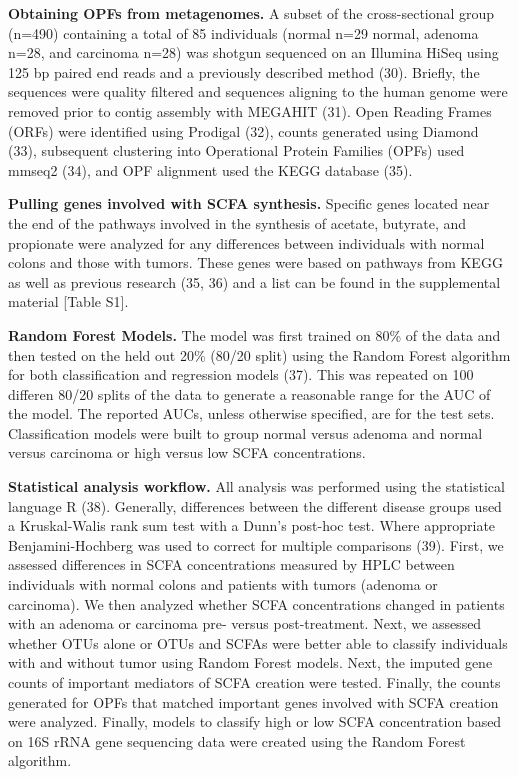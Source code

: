 \documentclass[11pt,]{article}
\begin{document}
\textbf{Obtaining OPFs from metagenomes.} A subset of the
cross-sectional group (n=490) containing a total of 85 individuals
(normal n=29 normal, adenoma n=28, and carcinoma n=28) was shotgun
sequenced on an Illumina HiSeq using 125 bp paired end reads and a
previously described method (30). Briefly, the sequences were quality
filtered and sequences aligning to the human genome were removed prior
to contig assembly with MEGAHIT (31). Open Reading Frames (ORFs) were
identified using Prodigal (32), counts generated using Diamond (33),
subsequent clustering into Operational Protein Families (OPFs) used
mmseq2 (34), and OPF alignment used the KEGG database (35).

\textbf{Pulling genes involved with SCFA synthesis.} Specific genes
located near the end of the pathways involved in the synthesis of
acetate, butyrate, and propionate were analyzed for any differences
between individuals with normal colons and those with tumors. These
genes were based on pathways from KEGG as well as previous research (35,
36) and a list can be found in the supplemental material {[}Table S1{]}.

\textbf{Random Forest Models.} The model was first trained on 80\% of
the data and then tested on the held out 20\% (80/20 split) using the
Random Forest algorithm for both classification and regression models
(37). This was repeated on 100 differen 80/20 splits of the data to
generate a reasonable range for the AUC of the model. The reported AUCs,
unless otherwise specified, are for the test sets. Classification models
were built to group normal versus adenoma and normal versus carcinoma or
high versus low SCFA concentrations.

\textbf{Statistical analysis workflow.} All analysis was performed using
the statistical language R (38). Generally, differences between the
different disease groups used a Kruskal-Walis rank sum test with a
Dunn's post-hoc test. Where appropriate Benjamini-Hochberg was used to
correct for multiple comparisons (39). First, we assessed differences in
SCFA concentrations measured by HPLC between individuals with normal
colons and patients with tumors (adenoma or carcinoma). We then analyzed
whether SCFA concentrations changed in patients with an adenoma or
carcinoma pre- versus post-treatment. Next, we assessed whether OTUs
alone or OTUs and SCFAs were better able to classify individuals with
and without tumor using Random Forest models. Next, the imputed gene
counts of important mediators of SCFA creation were tested. Finally, the
counts generated for OPFs that matched important genes involved with
SCFA creation were analyzed. Finally, models to classify high or low
SCFA concentration based on 16S rRNA gene sequencing data were created
using the Random Forest algorithm.
\end{document}
